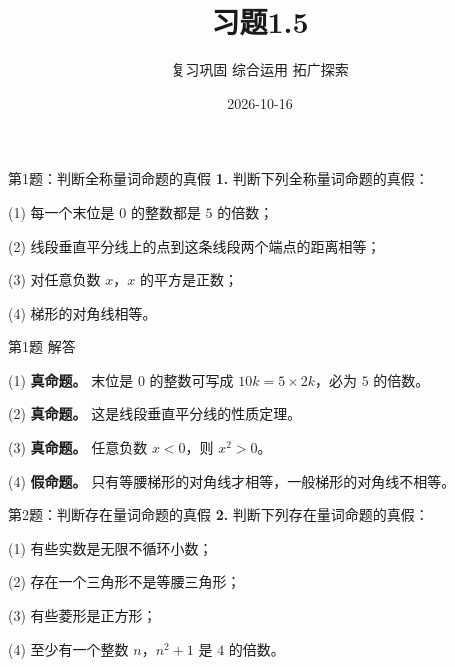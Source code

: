 \documentclass[10pt,aspectratio=169,serif]{beamer}
\title[习题1.5]{习题1.5}
\subtitle{复习巩固 \quad 综合运用 \quad 拓广探索}
\author{}
\institute{}
\date{2026-10-16}
\begin{document}
\begin{frame}
  \titlepage
\end{frame}

\begin{frame}[t]{第1题：判断全称量词命题的真假}
\textbf{1.} 判断下列全称量词命题的真假：

\vspace{0.5em}
(1) 每一个末位是 $0$ 的整数都是 $5$ 的倍数；

\vspace{0.3em}
(2) 线段垂直平分线上的点到这条线段两个端点的距离相等；

\vspace{0.3em}
(3) 对任意负数 $x$，$x$ 的平方是正数；

\vspace{0.3em}
(4) 梯形的对角线相等。
\end{frame}

\begin{frame}[t]{第1题 解答}
\begin{tcolorbox}[colback=orange!10,colframe=orange,title=\textbf{解}]
(1) \textbf{真命题。} 末位是 $0$ 的整数可写成 $10k = 5 \times 2k$，必为 $5$ 的倍数。

\vspace{0.5em}
(2) \textbf{真命题。} 这是线段垂直平分线的性质定理。

\vspace{0.5em}
(3) \textbf{真命题。} 任意负数 $x < 0$，则 $x^2 > 0$。

\vspace{0.5em}
(4) \textbf{假命题。} 只有等腰梯形的对角线才相等，一般梯形的对角线不相等。
\end{tcolorbox}
\end{frame}

\begin{frame}[t]{第2题：判断存在量词命题的真假}
\textbf{2.} 判断下列存在量词命题的真假：

\vspace{0.5em}
(1) 有些实数是无限不循环小数；

\vspace{0.3em}
(2) 存在一个三角形不是等腰三角形；

\vspace{0.3em}
(3) 有些菱形是正方形；

\vspace{0.3em}
(4) 至少有一个整数 $n$，$n^2 + 1$ 是 $4$ 的倍数。
\end{frame}
\end{document}
